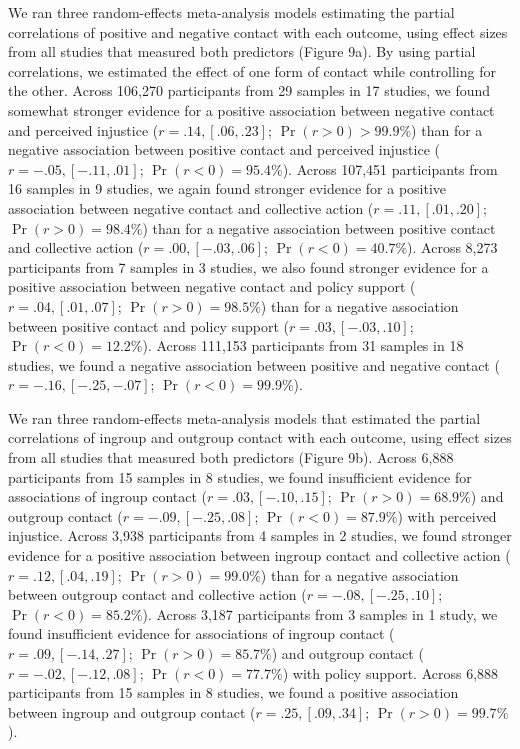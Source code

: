 \documentclass[12pt, letterpaper]{article}
\begin{document}
We ran three random-effects meta-analysis models estimating the partial
correlations of positive and negative contact with each outcome, using
effect sizes from all studies that measured both predictors (Figure 9a).
By using partial correlations, we estimated the effect of one form of
contact while controlling for the other. Across 106,270 participants
from 29 samples in 17 studies, we found somewhat stronger evidence for a
positive association between negative contact and perceived injustice
(\(r = .14, [.06, .23]\); \(\Pr (r > 0) > 99.9\%\)) than for a negative
association between positive contact and perceived injustice
(\(r = -.05, [-.11, .01]\); \(\Pr (r < 0) = 95.4\%\)). Across 107,451
participants from 16 samples in 9 studies, we again found stronger
evidence for a positive association between negative contact and
collective action (\(r = .11, [.01, .20]\); \(\Pr (r > 0) = 98.4\%\))
than for a negative association between positive contact and collective
action (\(r = .00, [-.03, .06]\); \(\Pr (r < 0) = 40.7\%\)). Across
8,273 participants from 7 samples in 3 studies, we also found stronger
evidence for a positive association between negative contact and policy
support (\(r = .04, [.01, .07]\); \(\Pr (r > 0) = 98.5\%\)) than for a
negative association between positive contact and policy support
(\(r = .03, [-.03, .10]\); \(\Pr (r < 0) = 12.2\%\)). Across 111,153
participants from 31 samples in 18 studies, we found a negative
association between positive and negative contact
(\(r = -.16, [-.25, -.07]\); \(\Pr (r < 0) = 99.9\%\)).

We ran three random-effects meta-analysis models that estimated the
partial correlations of ingroup and outgroup contact with each outcome,
using effect sizes from all studies that measured both predictors
(Figure 9b). Across 6,888 participants from 15 samples in 8 studies, we
found insufficient evidence for associations of ingroup contact
(\(r = .03, [-.10, .15]\); \(\Pr (r > 0) = 68.9\%\)) and outgroup
contact (\(r = -.09, [-.25, .08]\); \(\Pr (r < 0) = 87.9\%\)) with
perceived injustice. Across 3,938 participants from 4 samples in 2
studies, we found stronger evidence for a positive association between
ingroup contact and collective action (\(r = .12, [.04, .19]\);
\(\Pr (r > 0) = 99.0\%\)) than for a negative association between
outgroup contact and collective action (\(r = -.08, [-.25, .10]\);
\(\Pr (r < 0) = 85.2\%\)). Across 3,187 participants from 3 samples in 1
study, we found insufficient evidence for associations of ingroup
contact (\(r = .09, [-.14, .27]\); \(\Pr (r > 0) = 85.7\%\)) and
outgroup contact (\(r = -.02, [-.12, .08]\); \(\Pr (r < 0) = 77.7\%\))
with policy support. Across 6,888 participants from 15 samples in 8
studies, we found a positive association between ingroup and outgroup
contact (\(r = .25, [.09, .34]\); \(\Pr (r > 0) = 99.7\%\)).
\end{document}
